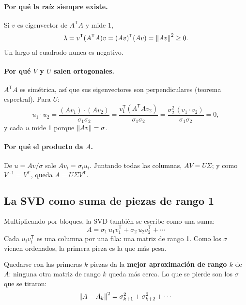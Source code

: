 \documentclass[11pt,letterpaper]{article}
\newcommand{\T}{^{\mathsf{T}}}
\begin{document}
\paragraph{Por qué la raíz siempre existe.} Si $v$ es eigenvector de
$A\T A$ y mide 1,
\[
    \lambda = v\T (A\T A) v = (A v)\T (A v) = \norm{A v}^2 \geq 0 .
\]
Un largo al cuadrado nunca es negativo.

\paragraph{Por qué $V$ y $U$ salen ortogonales.} $A\T A$ es simétrica,
así que sus eigenvectores son perpendiculares (teorema espectral). Para
$U$:
\[
    u_1 \cdot u_2
    = \frac{(A v_1) \cdot (A v_2)}{\sigma_1 \sigma_2}
    = \frac{v_1\T (A\T A v_2)}{\sigma_1 \sigma_2}
    = \frac{\sigma_2^2\, (v_1 \cdot v_2)}{\sigma_1 \sigma_2} = 0 ,
\]
y cada $u$ mide 1 porque $\left\lVert A v \right\rVert = \sigma$.

\paragraph{Por qué el producto da $A$.} De $u = A v / \sigma$ sale
$A v_i = \sigma_i u_i$. Juntando todas las columnas, $A V = U \Sigma$;
y como $V^{-1} = V\T$, queda $A = U \Sigma V\T$.

\subsection*{La SVD como suma de piezas de rango 1}

Multiplicando por bloques, la SVD también se escribe como una suma:
\[
    A = \sigma_1\, u_1 v_1\T + \sigma_2\, u_2 v_2\T + \cdots
\]
Cada $u_i v_i\T$ es una columna por una fila: una matriz de rango 1.
Como los $\sigma$ vienen ordenados, la primera pieza es la que más
pesa.

\begin{teorema}
    Quedarse con las primeras $k$ piezas da la \textbf{mejor
    aproximación de rango $k$} de $A$: ninguna otra matriz de rango $k$
    queda más cerca. Lo que se pierde son los $\sigma$ que se tiraron:
    \[
        \left\lVert A - A_k \right\rVert^2 = \sigma_{k+1}^2 + \sigma_{k+2}^2 + \cdots
    \]
\end{teorema}
\end{document}
